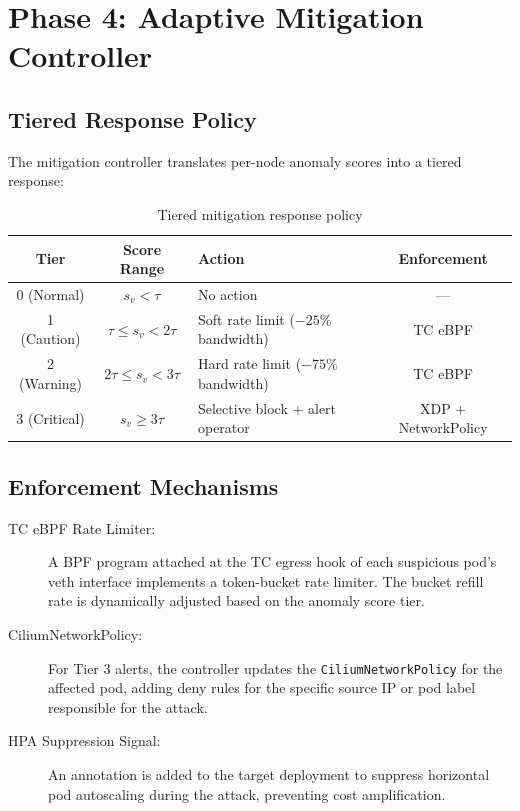 \section{Phase 4: Adaptive Mitigation Controller}
\label{sec:design_phase4}

\subsection{Tiered Response Policy}

The mitigation controller translates per-node anomaly scores into a tiered response:

\begin{table}[H]
\centering
\caption{Tiered mitigation response policy}
\label{tab:mitigation_tiers}
\begin{tabular}{cclc}
\toprule
\textbf{Tier} & \textbf{Score Range} & \textbf{Action} & \textbf{Enforcement} \\
\midrule
0 (Normal)     & $s_v < \tau$           & No action          & — \\
1 (Caution)    & $\tau \le s_v < 2\tau$ & Soft rate limit ($-25\%$ bandwidth) & TC eBPF \\
2 (Warning)    & $2\tau \le s_v < 3\tau$& Hard rate limit ($-75\%$ bandwidth) & TC eBPF \\
3 (Critical)   & $s_v \ge 3\tau$        & Selective block + alert operator    & XDP + NetworkPolicy \\
\bottomrule
\end{tabular}
\end{table}

\subsection{Enforcement Mechanisms}

\begin{description}
  \item[TC eBPF Rate Limiter:] A BPF program attached at the TC egress hook of each
  suspicious pod's veth interface implements a token-bucket rate limiter. The bucket
  refill rate is dynamically adjusted based on the anomaly score tier.

  \item[CiliumNetworkPolicy:] For Tier 3 alerts, the controller updates the
  \texttt{CiliumNetworkPolicy} for the affected pod, adding deny rules for the
  specific source IP or pod label responsible for the attack.

  \item[HPA Suppression Signal:] An annotation is added to the target deployment to
  suppress horizontal pod autoscaling during the attack, preventing cost amplification.
\end{description}

